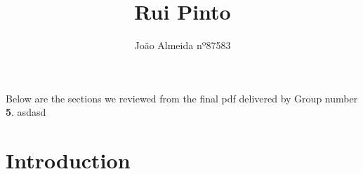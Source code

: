 \documentclass{article}
\title{Rui Pinto}
\author{ João Almeida nº87583}
\begin{document}
\maketitle

\tableofcontents

\clearpage

\paragraph{}
Below are the sections we reviewed from the final pdf delivered by Group number \textbf{5}.
asdasd
\section{Introduction}
\end{document}
